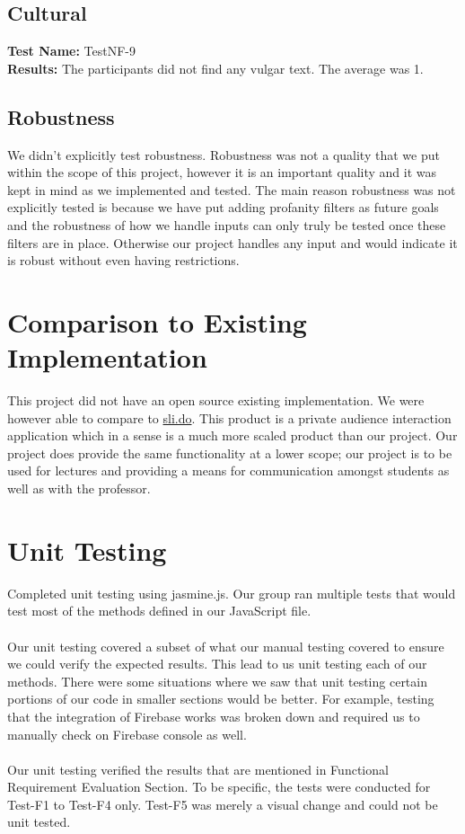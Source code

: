 \documentclass[12pt, titlepage]{article}
\begin{document}
\subsection{Cultural}
\textbf{Test Name:} TestNF-9 \\
\textbf{Results:} The participants did not find any vulgar text. The average was 1. \\

\subsection{Robustness}
We didn’t explicitly test robustness. Robustness was not a quality that we put within the scope of this project, however it is an important quality and it was kept in mind as we implemented and tested. The main reason robustness was not explicitly tested is because we have put adding profanity filters as future goals and the robustness of how we handle inputs can only truly be tested once these filters are in place. Otherwise our project handles any input and would indicate it is robust without even having restrictions. \\
	
\section{Comparison to Existing Implementation}	

This project did not have an open source existing implementation. We were however able to compare to  \href{https://www.sli.do/}{sli.do}. This product is a private audience interaction application which in a sense is a much more scaled product than our project. Our project does provide the same functionality at a lower scope; our project is to be used for lectures and providing a means for communication amongst students as well as with the professor. 

\section{Unit Testing}

Completed unit testing using jasmine.js.
Our group ran multiple tests that would test most of the methods defined in our JavaScript file. \\
\\
Our unit testing covered a subset of what our manual testing covered to ensure we could verify the expected results. This lead to us unit testing each of our methods.
There were some situations where we saw that unit testing certain portions of our code in smaller sections would be better. For example, testing that the integration of Firebase works was broken down and required us to manually check on Firebase console as well. \\
\\
Our unit testing verified the results that are mentioned in Functional Requirement Evaluation Section. To be specific, the tests were conducted for Test-F1 to Test-F4 only. Test-F5 was merely a visual change and could not be unit tested. 
\end{document}
